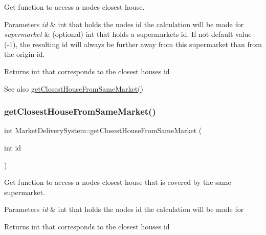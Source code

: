 Get function to access a node\textquotesingle{}s closest house. 


\begin{DoxyParams}{Parameters}
{\em id} & int that holds the node\textquotesingle{}s id the calculation will be made for \\
\hline
{\em supermarket} & (optional) int that holds a supermarket\textquotesingle{}s id. If not default value (-\/1), the resulting id will always be further away from this supermarket than from the origin id. \\
\hline
\end{DoxyParams}
\begin{DoxyReturn}{Returns}
int that corresponds to the closest house\textquotesingle{}s id 
\end{DoxyReturn}
\begin{DoxySeeAlso}{See also}
\hyperlink{class_market_delivery_system_a93e0f821f91f165e7f69c8589b1ce5b4}{get\+Closest\+House\+From\+Same\+Market()} 
\end{DoxySeeAlso}
\hypertarget{class_market_delivery_system_a93e0f821f91f165e7f69c8589b1ce5b4}{}\label{class_market_delivery_system_a93e0f821f91f165e7f69c8589b1ce5b4} 
\subsubsection{\texorpdfstring{get\+Closest\+House\+From\+Same\+Market()}{getClosestHouseFromSameMarket()}}
{\footnotesize\ttfamily int Market\+Delivery\+System\+::get\+Closest\+House\+From\+Same\+Market (\begin{DoxyParamCaption}\item[{int}]{id }\end{DoxyParamCaption})}



Get function to access a node\textquotesingle{}s closest house that is covered by the same supermarket. 


\begin{DoxyParams}{Parameters}
{\em id} & int that holds the node\textquotesingle{}s id the calculation will be made for \\
\hline
\end{DoxyParams}
\begin{DoxyReturn}{Returns}
int that corresponds to the closest house\textquotesingle{}s id 
\end{DoxyReturn}
\hypertarget{class_market_delivery_system_ae4079938c218b1cbfcd2fe2908dbf85f}{}\label{class_market_delivery_system_ae4079938c218b1cbfcd2fe2908dbf85f} 
